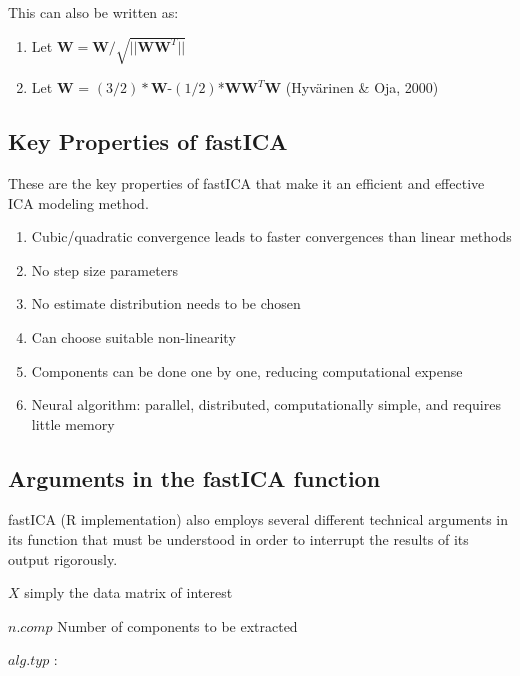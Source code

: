 \documentclass[12pt,twoside]{amherstthesis}
\begin{document}
  This can also be written as:
  
  \begin{enumerate}
  \def\labelenumi{\arabic{enumi}.}
  \item
    Let \(\textbf{W} = \textbf{W}/\sqrt{||\textbf{WW}^T||}\)
  \item
    Let \(\textbf{W}\) =
    \((3/2)*\)\(\textbf{W}\)-\((1/2)\)*\(\textbf{W}\textbf{W}^T\textbf{W}\)
    (Hyvärinen \& Oja, 2000)
  \end{enumerate}
  
  \subsection{Key Properties of fastICA}\label{key-properties-of-fastica}
  
  These are the key properties of fastICA that make it an efficient and
  effective ICA modeling method.
  
  \begin{enumerate}
  \def\labelenumi{\arabic{enumi}.}
  \item
    Cubic/quadratic convergence leads to faster convergences than linear
    methods
  \item
    No step size parameters
  \item
    No estimate distribution needs to be chosen
  \item
    Can choose suitable non-linearity
  \item
    Components can be done one by one, reducing computational expense
  \item
    Neural algorithm: parallel, distributed, computationally simple, and
    requires little memory
  \end{enumerate}
  
  \subsection{Arguments in the fastICA
  function}\label{arguments-in-the-fastica-function}
  
  fastICA (R implementation) also employs several different technical
  arguments in its function that must be understood in order to interrupt
  the results of its output rigorously.
  
  \(X\) simply the data matrix of interest
  
  \(n.comp\) Number of components to be extracted
  
  \(alg.typ\) : \newline
  
\end{document}
